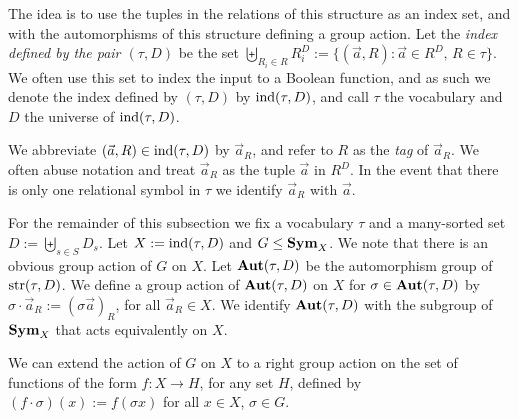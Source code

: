 \documentclass[../paper.tex]{subfiles}
\begin{document}
The idea is to use the tuples in the relations of this structure as an index
set, and with the automorphisms of this structure defining a group action. Let
the \emph{index defined by the pair $(\tau, D)$} be the set $\biguplus_{R_i\in
  R} R^{D}_i := \{ (\vec{a}, R) : \vec{a} \in R^{D}, \, R \in \tau \} $. We
often use this set to index the input to a Boolean function, and as such we
denote the index defined by $(\tau, D)$ by $\text{\upshape ind}(\tau, D)$, and call $\tau$ the
vocabulary and $D$ the universe of $\text{\upshape ind}(\tau, D)$.

We abbreviate $(\vec{a}, R) \in \text{\upshape ind}(\tau, D)$ by $\vec{a}_R$, and refer to $R$
as the \emph{tag} of $\vec{a}_R$. We often abuse notation and treat $\vec{a}_R$
as the tuple $\vec{a}$ in $R^D$. In the event that there is only one relational
symbol in $\tau$ we identify $\vec{a}_R$ with $\vec{a}$.



For the remainder of this subsection we fix a vocabulary $\tau$ and a
many-sorted set $D := \biguplus_{s \in S} D_{s}$. Let $X := \text{\upshape ind} (\tau, D)$ and
$G \leq \text{\textbf{Sym}}_{X}$. We note that there is an obvious group action of $G$ on
$X$. Let $\text{\textbf{Aut}} (\tau, D)$ be the automorphism group of $\text{str}(\tau, D)$. We
define a group action of $\text{\textbf{Aut}} (\tau, D)$ on $X$ for $\sigma \in \text{\textbf{Aut}}(\tau, D)$
by $\sigma \cdot \vec{a}_R := (\sigma \vec{a})_R$, for all $\vec{a}_R \in X$. We
identify $\text{\textbf{Aut}}(\tau, D)$ with the subgroup of $\text{\textbf{Sym}}_X$ that acts equivalently on
$X$.

We can extend the action of $G$ on $X$ to a right group action on the set of
functions of the form $f: X \rightarrow H$, for any set $H$, defined by $(f
\cdot \sigma)(x) := f(\sigma x)$ for all $x \in X$, $\sigma \in G$.




\end{document}
